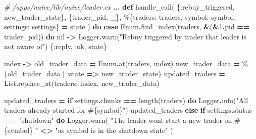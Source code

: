 \documentclass[
  oneside]{book}
\newenvironment{Shaded}{\begin{snugshade}}{\end{snugshade}}
\newcommand{\CommentTok}[1]{\textcolor[rgb]{0.56,0.35,0.01}{\textit{#1}}}
\newcommand{\ConstantTok}[1]{\textcolor[rgb]{0.00,0.00,0.00}{#1}}
\newcommand{\ControlFlowTok}[1]{\textcolor[rgb]{0.13,0.29,0.53}{\textbf{#1}}}
\newcommand{\DecValTok}[1]{\textcolor[rgb]{0.00,0.00,0.81}{#1}}
\newcommand{\KeywordTok}[1]{\textcolor[rgb]{0.13,0.29,0.53}{\textbf{#1}}}
\newcommand{\NormalTok}[1]{#1}
\newcommand{\OperatorTok}[1]{\textcolor[rgb]{0.81,0.36,0.00}{\textbf{#1}}}
\newcommand{\OtherTok}[1]{\textcolor[rgb]{0.56,0.35,0.01}{#1}}
\newcommand{\StringTok}[1]{\textcolor[rgb]{0.31,0.60,0.02}{#1}}
\newcommand{\VariableTok}[1]{\textcolor[rgb]{0.00,0.00,0.00}{#1}}
\begin{document}
\begin{Shaded}
\begin{Highlighting}[]
\CommentTok{\# /apps/naive/lib/naive/leader.ex}
  \OperatorTok{...}
  \KeywordTok{def}\NormalTok{ handle\_call(}
\NormalTok{        \{}\VariableTok{:rebuy\_triggered}\NormalTok{, new\_trader\_state\},}
\NormalTok{        \{trader\_pid, \_\},}
\NormalTok{        \%\{}\VariableTok{traders:}\NormalTok{ traders, }\VariableTok{symbol:}\NormalTok{ symbol, }\VariableTok{settings:}\NormalTok{ settings\} }\OperatorTok{=}\NormalTok{ state}
\NormalTok{      ) }\KeywordTok{do}
    \KeywordTok{case} \ConstantTok{Enum}\OperatorTok{.}\NormalTok{find\_index(traders, }\OperatorTok{\&}\NormalTok{(}\OperatorTok{\&}\DecValTok{1}\OperatorTok{.}\NormalTok{pid }\OperatorTok{==}\NormalTok{ trader\_pid)) }\KeywordTok{do}
      \ConstantTok{nil} \OperatorTok{{-}\textgreater{}}
        \ConstantTok{Logger}\OperatorTok{.}\NormalTok{warn(}\StringTok{"Rebuy triggered by trader that leader is not aware of"}\NormalTok{)}
\NormalTok{        \{}\VariableTok{:reply}\NormalTok{, }\VariableTok{:ok}\NormalTok{, state\}}

\NormalTok{      index }\OperatorTok{{-}\textgreater{}}
\NormalTok{        old\_trader\_data }\OperatorTok{=} \ConstantTok{Enum}\OperatorTok{.}\NormalTok{at(traders, index)}
\NormalTok{        new\_trader\_data }\OperatorTok{=}\NormalTok{ \%\{old\_trader\_data }\OperatorTok{|} \VariableTok{:state} \OperatorTok{=\textgreater{}}\NormalTok{ new\_trader\_state\}}
\NormalTok{        updated\_traders }\OperatorTok{=} \ConstantTok{List}\OperatorTok{.}\NormalTok{replace\_at(traders, index, new\_trader\_data)}

\NormalTok{        updated\_traders }\OperatorTok{=}
          \ControlFlowTok{if}\NormalTok{ settings}\OperatorTok{.}\NormalTok{chunks }\OperatorTok{==}\NormalTok{ length(traders) }\KeywordTok{do}
            \ConstantTok{Logger}\OperatorTok{.}\NormalTok{info(}\StringTok{"All traders already started for }\OtherTok{\#\{}\NormalTok{symbol}\OtherTok{\}}\StringTok{"}\NormalTok{)}
\NormalTok{            updated\_traders}
          \ControlFlowTok{else}
            \ControlFlowTok{if}\NormalTok{ settings}\OperatorTok{.}\NormalTok{status }\OperatorTok{==} \StringTok{"shutdown"} \KeywordTok{do}
              \ConstantTok{Logger}\OperatorTok{.}\NormalTok{warn(}
                \StringTok{"The leader won\textquotesingle{}t start a new trader on }\OtherTok{\#\{}\NormalTok{symbol}\OtherTok{\}}\StringTok{ "} \OperatorTok{\textless{}\textgreater{}}
                  \StringTok{"as symbol is in the \textquotesingle{}shutdown\textquotesingle{} state"}
\NormalTok{              )}


\end{Highlighting}
\end{Shaded}
\end{document}
